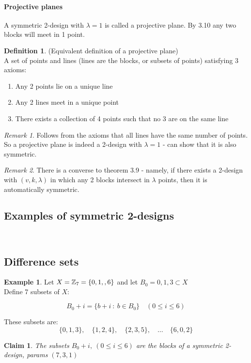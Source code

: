 \documentclass[]{article}
\newtheorem*{clm}{Claim}
\theoremstyle{definition}
\newtheorem*{defn}{Definition}
\newtheorem*{exmp}{Example}
\theoremstyle{remark}
\newtheorem*{rem}{Remark}
\numberwithin{equation}{section}
\begin{document}
		\paragraph*{Projective planes}
			A symmetric 2-design with $\lambda = 1$ is called a projective plane. By 3.10 any two blocks will meet in 1 point.

			\begin{defn}(Equivalent definition of a projective plane)\hfill\\
				A set of points and lines (lines are the blocks, or subsets of points) satisfying 3 axioms:
				\begin{enumerate}
					\item Any 2 points lie on a unique line
					\item Any 2 lines meet in a unique point
					\item There exists a collection of 4 points such that no 3 are on the same line
				\end{enumerate}
			\end{defn}

			\begin{rem}
				Follows from the axioms that all lines have the same number of points. So a projective plane is indeed a 2-design with $\lambda = 1$ - can show that it is also symmetric.
			\end{rem}

			\begin{rem}
				There is a converse to theorem 3.9 - namely, if there exists a 2-design with $(v, k, \lambda)$ in which any 2 blocks intersect in $\lambda $ points, then it is automatically symmetric.
			\end{rem}

	\subsection{Examples of symmetric 2-designs}\hfill\\
		\subsection*{Difference sets}
			\begin{exmp}
				Let $X = \ZZ_7 = \{0, 1, \hfill, 6\}$ and let $B_0 = {0, 1, 3} \subset X$\\
				Define 7 subsets of $X$:

				\[
					B_0 + i = \{b+i\ :\ b \in B_0\} \quad (0 \leq i \leq 6)
				\]

				These subsets are:
				\[
					\{0, 1, 3\}, \quad \{1, 2, 4\}, \quad \{2, 3, 5\},\quad \hdots \quad \{6,0,2\}
				\]
			\end{exmp}
			\begin{clm} The subsets $B_0 + i,\ (0 \leq i \leq 6)$ are the blocks of a symmetric 2-design, params $(7,3,1)$
			\end{clm}
\end{document}
